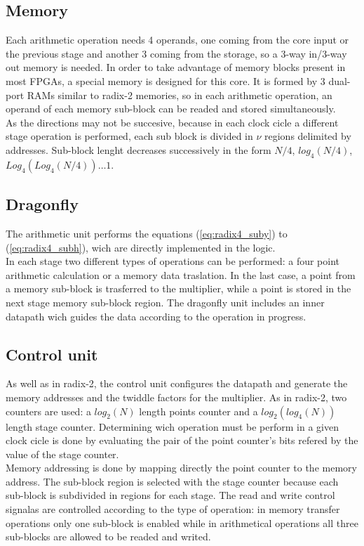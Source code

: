 \documentclass[conference]{IEEEtran}
\begin{document}
\subsection{Memory}

Each arithmetic operation needs 4 operands, one coming from the core input or the previous stage and another
3 coming from the storage, so a 3-way in/3-way out memory is needed. In order to take advantage of memory blocks present 
in most FPGAs, a special memory is designed for this core. It is formed by 3 dual-port RAMs similar to radix-2 memories, so
in each arithmetic operation, an operand of each memory sub-block can be readed and stored simultaneously.\\
As the directions may not be succesive, because in each clock cicle a different stage operation is performed, each sub block 
is divided in $\nu$ regions delimited by addresses. Sub-block lenght decreases successively in the form $N/4$, $log_4(N/4)$, $Log_4(Log_4(N/4)) \ldots 1$. 
 
\subsection{Dragonfly}

The arithmetic unit performs the equations (\ref{eq:radix4_suby}) to (\ref{eq:radix4_subh}), wich are directly implemented in 
the logic.\\
In each stage two different types of operations can be performed: a four point arithmetic calculation or a memory data traslation.
In the last case, a point from a memory sub-block is trasferred to the multiplier, while a point is stored in the next stage memory sub-block region.
The dragonfly unit includes an inner datapath wich guides the data according to the operation in progress.
 
\subsection{Control unit}
 
As well as in radix-2, the control unit configures the datapath and generate the memory addresses and the twiddle factors for
the multiplier. As in radix-2, two counters are used: a $log_2(N)$ length points counter and a $log_2(log_4(N))$ length stage counter. 
Determining wich operation must be perform in a given clock cicle is done by evaluating the pair of the point counter's bits 
refered by the value of the stage counter.\\   
Memory addressing is done by mapping directly the point counter to the memory address. The sub-block region is selected with the 
stage counter because each sub-block is subdivided in regions for each stage. The read and write control signalas are controlled according 
to the type of operation: in memory transfer operations only one sub-block is enabled while in arithmetical operations all three sub-blocks
are allowed to be readed and writed.
\end{document}
